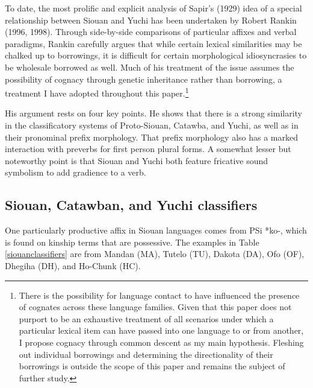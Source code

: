 \documentclass[output=paper]{LSP/langsci}
\begin{document}
To date, the most prolific and explicit analysis of Sapir's (1929) idea of a special relationship between Siouan and Yuchi has been undertaken by Robert Rankin (1996, 1998). Through side-by-side comparisons of particular affixes and verbal paradigms, Rankin carefully argues that while certain lexical similarities may be chalked up to borrowings, it is difficult for certain morphological idiosyncrasies to be wholesale borrowed as well. Much of his treatment of the issue assumes the possibility of cognacy through genetic inheritance rather than borrowing, a treatment I have adopted throughout this paper.\footnote{There is the possibility for language contact to have influenced the presence of cognates across these language families. Given that this paper does not purport to be an exhaustive treatment of all scenarios under which a particular lexical item can have passed into one language to or from another, I propose cognacy through common descent as my main hypothesis. Fleshing out individual borrowings and determining the directionality of their borrowings is outside the scope of this paper and remains the subject of further study.}

His argument rests on four key points. He shows that there is a strong similarity in the classificatory systems of Proto-Siouan, Catawba, and Yuchi, as well as in their pronominal prefix morphology. That prefix morphology also has a marked interaction with preverbs for first person plural forms. A somewhat lesser but noteworthy point is that Siouan and Yuchi both feature fricative sound symbolism to add gradience to a verb.

\subsection{Siouan, Catawban, and Yuchi classifiers}

One particularly productive affix in Siouan languages comes from PSi *ko-, which is found on kinship terms that are possessive. The examples in Table \ref{siouanclassifiers} are from Mandan (MA), Tutelo (TU), Dakota (DA), Ofo (OF), Dhegiha (DH), and Ho-Chunk (HC).

\begin{table} 
\end{table}
\end{document}
